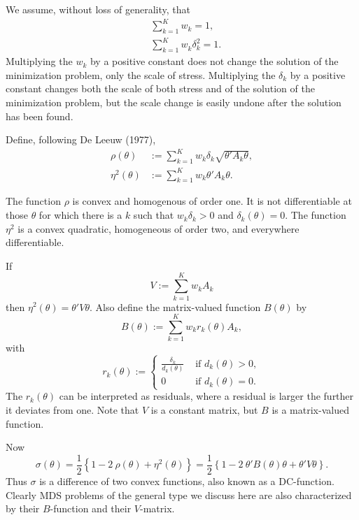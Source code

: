 \documentclass[
  12pt,
]{article}
\begin{document}
We assume, without loss of generality, that
\begin{align}
&\sum_{k=1}^K w_k=1,\\
&\sum_{k=1}^K w_k^{\ }\delta_k^2=1.
\end{align}
Multiplying the \(w_k\) by a positive constant does not change the solution of the minimization
problem, only the scale of stress. Multiplying the \(\delta_k\) by a positive constant
changes both the scale of both stress and of the solution of the minimization problem, but the scale
change is easily undone after the solution has been found.

Define, following De Leeuw (1977),
\begin{align}
\rho(\theta)&:=\sum_{k=1}^K w_k\delta_k\sqrt{\theta'A_k\theta},\\
\eta^2(\theta)&:=\sum_{k=1}^K w_k\theta'A_k\theta.
\end{align}

The function \(\rho\) is convex and homogenous of order one. It is not differentiable
at those \(\theta\) for which there is a \(k\) such that \(w_k\delta_k>0\) and
\(\delta_k(\theta)=0\). The function \(\eta^2\) is a convex quadratic, homogeneous
of order two, and everywhere differentiable.

If
\begin{equation}
V:=\sum_{k=1}^K w_kA_k
\label{eq:genvdef}
\end{equation}
then \(\eta^2(\theta)=\theta'V\theta\). Also define the matrix-valued
function \(B(\theta)\) by
\begin{equation}
B(\theta):=\sum_{k=1}^K w_kr_k(\theta)A_k,
\label{eq:genbdef}
\end{equation}
with
\begin{equation}
r_k(\theta):=\begin{cases}\frac{\delta_k}{d_k(\theta)}&\text{ if }d_k(\theta)>0,\\
0&\text{ if }d_k(\theta)=0.
\end{cases}
\label{eq:rkdef}
\end{equation}
The \(r_k(\theta)\) can be interpreted as residuals, where a residual is larger the further it deviates from one. Note that \(V\) is a constant matrix, but \(B\) is a matrix-valued function.

Now
\begin{equation}
\sigma(\theta)=\frac12\left\{1-2\ \rho(\theta)+\eta^2(\theta)\right\}=
\frac12\left\{1-2\ \theta'B(\theta)\theta+\theta'V\theta\right\}.
\label{eq:genstressalt}
\end{equation}
Thus \(\sigma\) is a difference of two convex functions, also known as a DC-function.
Clearly MDS problems of the general type we discuss here are also characterized by their
\(B\)-function and their \(V\)-matrix.
\end{document}
